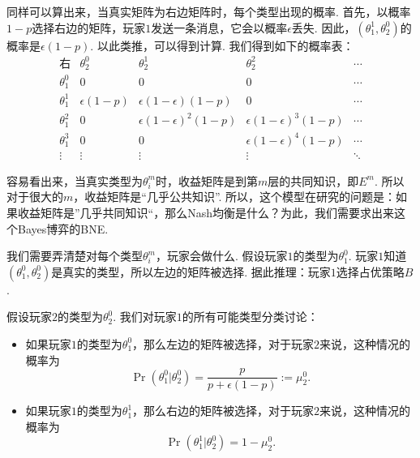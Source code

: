 同样可以算出来，当真实矩阵为右边矩阵时，每个类型出现的概率. 首先，以概率$1 - p$选择右边的矩阵，玩家$1$发送一条消息，它会以概率$\epsilon$丢失. 因此，$(\theta_1^1,\theta_2^0)$的概率是$\epsilon(1 - p)$. 以此类推，可以得到计算. 我们得到如下的概率表：
\[
\begin{array}{c|cccc}
\text{右} & \theta_2^0 & \theta_2^1 & \theta_2^2 & \cdots \\
\hline
\theta_1^0 & 0 & 0 & 0 & \cdots \\
\theta_1^1 & \epsilon(1 - p) & \epsilon(1 - \epsilon)(1 - p) & 0 & \cdots \\
\theta_1^2 & 0 & \epsilon(1 - \epsilon)^2(1 - p) & \epsilon(1 - \epsilon)^3(1 - p) & \cdots \\
\theta_1^3 & 0 & 0 & \epsilon(1 - \epsilon)^4(1 - p) & \cdots \\
\vdots & \vdots & \vdots & \vdots & \ddots
\end{array}
\]


容易看出来，当真实类型为$\theta_i^m$时，收益矩阵是到第$m$层的共同知识，即$E^m$. 所以对于很大的$m$，收益矩阵是“几乎公共知识”. 所以，这个模型在研究的问题是：如果收益矩阵是”几乎共同知识“，那么Nash均衡是什么？为此，我们需要求出来这个Bayes博弈的BNE.

我们需要弄清楚对每个类型$\theta_i^m$，玩家会做什么. 假设玩家$1$的类型为$\theta_1^0$. 玩家$1$知道$(\theta_1^0,\theta_2^0)$是真实的类型，所以左边的矩阵被选择. 据此推理：玩家$1$选择占优策略$B$.

假设玩家$2$的类型为$\theta_2^0$. 我们对玩家$1$的所有可能类型分类讨论：
\begin{itemize}
    \item 如果玩家$1$的类型为$\theta_1^0$，那么左边的矩阵被选择，对于玩家$2$来说，这种情况的概率为
    \[\Pr(\theta_1^0|\theta_2^0) = \frac{p}{p+\epsilon(1-p)} := \mu_2^0.\] 
    \item 如果玩家$1$的类型为$\theta_1^1$，那么右边的矩阵被选择，对于玩家$2$来说，这种情况的概率为
    \[\Pr(\theta_1^1|\theta_2^0) = 1 - \mu_2^0.\]
\end{itemize}

